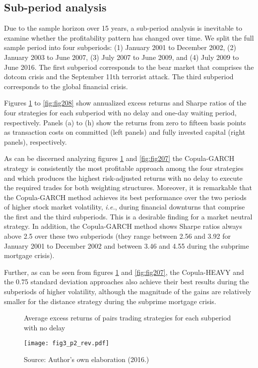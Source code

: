 \documentclass[a4paper,12pt]{report}
\begin{document}
\vspace{1.0cm}

\subsection{Sub-period analysis}

Due to the sample horizon over 15 years, a sub-period analysis is inevitable to examine whether the profitability pattern has changed over time. We split the full sample period into four subperiods: (1) January 2001 to December 2002, (2) January 2003 to June 2007, (3) July 2007 to June 2009, and (4) July 2009 to June 2016. The first subperiod corresponds to the bear market that comprises the dotcom crisis and the September 11th terrorist attack. The third subperiod corresponds to the global financial crisis.

Figures \ref{fig:fig205} to \ref{fig:fig208} show annualized excess returns and Sharpe ratios of the four strategies for each subperiod with no delay and one-day waiting period, respectively. Panels (a) to (h) show the returns from zero to fifteen basis points as transaction costs on committed (left panels) and fully invested capital (right panels), respectively. 

As can be discerned analyzing figures \ref{fig:fig205} and \ref{fig:fig207} the Copula-GARCH strategy is consistently the most profitable approach among the four strategies and which produces the highest risk-adjusted returns with no delay to execute the required trades for both weighting structures. Moreover, it is remarkable that the Copula-GARCH method achieves its best performance over the two periods of higher stock market volatility, \emph{i.e.}, during financial downturns that comprise the first and the third subperiods. This is a desirable finding for a market neutral strategy. In addition, the Copula-GARCH method shows Sharpe ratios always above 2.5 over these two subperiods (they range between 2.56 and 3.92 for January 2001 to December 2002 and between 3.46 and 4.55 during the subprime mortgage crisis).

Further, as can be seen from figures \ref{fig:fig205} and \ref{fig:fig207}, the Copula-HEAVY and the 0.75 standard deviation approaches also achieve their best results during the subperiods of higher volatility, although the magnitude of the gains are relatively smaller for the distance strategy during the subprime mortgage crisis. 

\begin{figure}[H]
	\centering
	\caption{Average excess returns of pairs trading strategies for each subperiod with no delay}
	\texttt{[image: fig3\_p2\_rev.pdf]}
	\captionsetup{justification=raggedright,
		singlelinecheck=false
	}
	\caption*{Source: Author's own elaboration (2016.)}
	\label{fig:fig205}
\end{figure}
\end{document}
